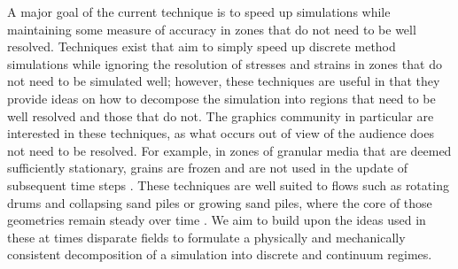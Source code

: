 A major goal of the current technique is to speed up simulations while maintaining some measure of accuracy in zones that do not need to be well resolved. Techniques exist that aim to simply speed up discrete method simulations while ignoring the resolution of stresses and strains in zones that do not need to be simulated well; however, these techniques are useful in that they provide ideas on how to decompose the simulation into regions that need to be well resolved and those that do not. The graphics community in particular are interested in these techniques, as what occurs out of view of the audience does not need to be resolved. For example, in zones of granular media that are deemed sufficiently stationary, grains are frozen and are not used in the update of subsequent time steps \cite{Smith:2005}. These techniques are well suited to flows such as rotating drums and collapsing sand piles or growing sand piles, where the core of those geometries remain steady over time \cite{McCarthy:1998,Hsu:2010,Zhu:2010,Bouchaud:1994}. We aim to build upon the ideas used in these at times disparate fields to formulate a physically and mechanically consistent decomposition of a simulation into discrete and continuum regimes.

